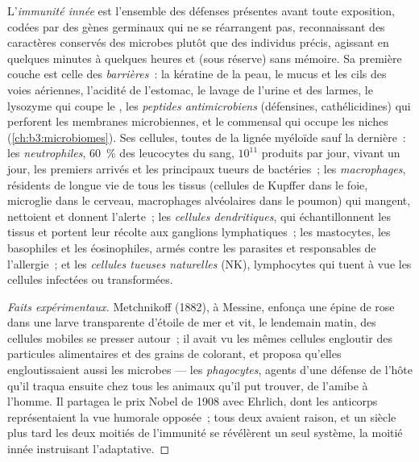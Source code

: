 \begin{definition}\label{def:b3:innate-immunity:innate}
L'\emph{immunité innée} est l'ensemble des défenses présentes avant
toute exposition, codées par des gènes germinaux qui ne se réarrangent
pas, reconnaissant des caractères conservés des microbes plutôt que des
individus précis, agissant en quelques minutes à quelques heures et
(sous réserve) sans mémoire. Sa première couche est celle des
\emph{barrières}~: la kératine de la peau, le mucus et les cils des
voies aériennes, l'acidité de l'estomac, le lavage de l'urine et des
larmes, le lysozyme qui coupe le , les \emph{peptides
antimicrobiens} (défensines, cathélicidines) qui perforent les membranes
microbiennes, et le  commensal qui occupe les niches
(\cref{ch:b3:microbiomes}). Ses cellules, toutes de la lignée myéloïde
sauf la dernière~: les \emph{neutrophiles}, \qty{60}{\%} des leucocytes
du sang, $10^{11}$ produits par jour, vivant un jour, les premiers
arrivés et les principaux tueurs de bactéries~; les \emph{macrophages},
résidents de longue vie de tous les tissus (cellules de Kupffer dans le
foie, microglie dans le cerveau, macrophages alvéolaires dans le poumon)
qui mangent, nettoient et donnent l'alerte~; les \emph{cellules
dendritiques}, qui échantillonnent les tissus et portent leur récolte
aux ganglions lymphatiques~; les mastocytes, les basophiles et les
éosinophiles, armés contre les parasites et responsables de l'allergie~;
et les \emph{cellules tueuses naturelles} (NK), lymphocytes qui tuent à
vue les cellules infectées ou transformées.
\end{definition}

\begin{proof}[Faits expérimentaux]
Metchnikoff (1882), à Messine, enfonça une épine de rose dans une larve
transparente d'étoile de mer et vit, le lendemain matin, des cellules
mobiles se presser autour~; il avait vu les mêmes cellules engloutir des
particules alimentaires et des grains de colorant, et proposa qu'elles
engloutissaient aussi les microbes --- les \emph{phagocytes}, agents
d'une défense de l'hôte qu'il traqua ensuite chez tous les animaux qu'il
put trouver, de l'amibe à l'homme. Il partagea le prix Nobel de 1908
avec Ehrlich, dont les anticorps représentaient la vue humorale
opposée~; tous deux avaient raison, et un siècle plus tard les deux
moitiés de l'immunité se révélèrent un seul système, la moitié innée
instruisant l'adaptative.
\end{proof}

